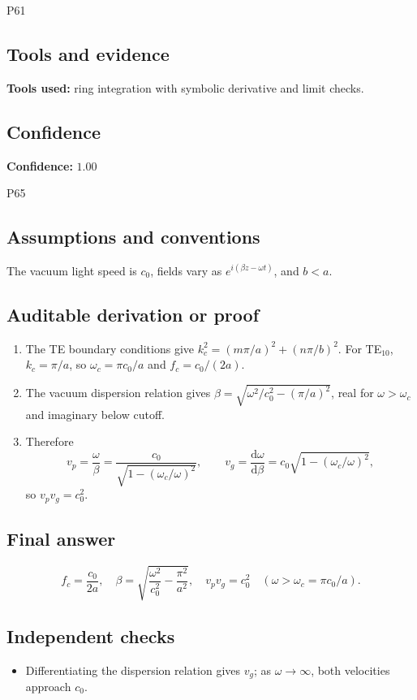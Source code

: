 \documentclass[11pt]{article}
\newcommand{\dd}{\mathrm{d}}
\begin{document}
\begin{mprsolution}{P61}
\subsection*{Tools and evidence}
\textbf{Tools used:} ring integration with symbolic derivative and limit checks.
\subsection*{Confidence}
\textbf{Confidence:} \(1.00\)
\end{mprsolution}

\begin{mprsolution}{P65}
\subsection*{Assumptions and conventions}
The vacuum light speed is \(c_0\), fields vary as
\(e^{i(\beta z-\omega t)}\), and \(b<a\).
\subsection*{Auditable derivation or proof}
\begin{enumerate}[label=\textbf{Step \arabic*:},leftmargin=*]
\item The TE boundary conditions give
\(k_c^2=(m\pi/a)^2+(n\pi/b)^2\).  For TE\(_{10}\),
\(k_c=\pi/a\), so \(\omega_c=\pi c_0/a\) and \(f_c=c_0/(2a)\).
\item The vacuum dispersion relation gives
\(\beta=\sqrt{\omega^2/c_0^2-(\pi/a)^2}\), real for
\(\omega>\omega_c\) and imaginary below cutoff.
\item Therefore
\[
v_p=\frac{\omega}{\beta}
=\frac{c_0}{\sqrt{1-(\omega_c/\omega)^2}},\qquad
v_g=\frac{\dd\omega}{\dd\beta}
=c_0\sqrt{1-(\omega_c/\omega)^2},
\]
so \(v_pv_g=c_0^2\).
\end{enumerate}
\subsection*{Final answer}
\[
\boxed{\displaystyle
f_c=\frac{c_0}{2a},\quad
\beta=\sqrt{\frac{\omega^2}{c_0^2}-\frac{\pi^2}{a^2}},\quad
v_pv_g=c_0^2\quad(\omega>\omega_c=\pi c_0/a).}
\]
\subsection*{Independent checks}
\begin{itemize}[leftmargin=*]
\item Differentiating the dispersion relation gives \(v_g\); as
\(\omega\to\infty\), both velocities approach \(c_0\).
\end{itemize}

\end{mprsolution}
\end{document}
